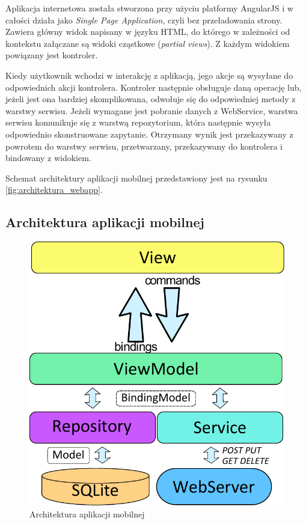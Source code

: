 \documentclass{book}
\begin{document}
			Aplikacja internetowa została stworzona przy użyciu platformy AngularJS i w całości działa jako \emph{Single Page Application}, czyli  bez przeładowania strony. Zawiera główny widok napisany w języku HTML, do którego w zależności od kontekstu załączane są widoki cząstkowe (\emph{partial views}). Z każdym widokiem powiązany jest kontroler. 
			
			Kiedy użytkownik wchodzi w interakcję z aplikacją, jego akcje są wysyłane do odpowiednich akcji kontrolera. Kontroler następnie obsługuje daną operację lub, jeżeli jest ona bardziej skomplikowana, odwołuje się do odpowiedniej metody z warstwy serwisu. Jeżeli wymagane jest pobranie danych z WebService, warstwa serwisu komunikuje się z warstwą repozytorium, która następnie wysyła odpowiednio skonstruowane zapytanie. Otrzymany wynik jest przekazywany z powrotem do warstwy serwisu, przetwarzany, przekazywany do kontrolera i bindowany z widokiem.								

			Schemat architektury aplikacji mobilnej przedstawiony jest na rysunku \ref{fig:architektura_webapp}.			
			
			\subsection{Architektura aplikacji mobilnej}
			\label{sec:ArchitekturaAplikacjiMobilnej}	
			
			\begin{figure}
				\centering
				\includegraphics[width=1\textwidth]{architektura_mobile.pdf}
				\caption{Architektura aplikacji mobilnej}
				\label{fig:architektura_mobile}
			\end{figure}
			
\end{document}
